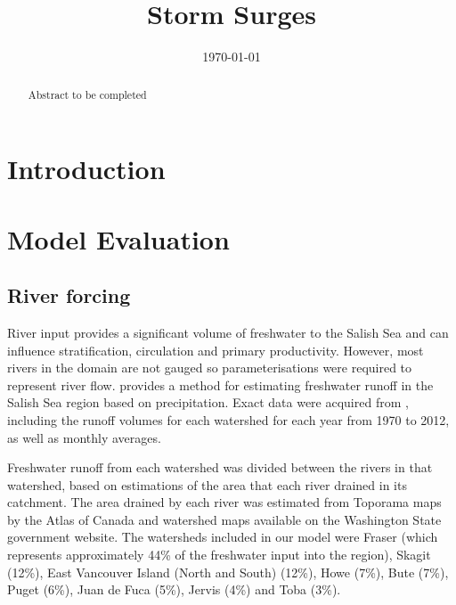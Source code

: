 \documentclass[pdftex,12pt]{article}
\title{Storm Surges}
\date{\today}
\begin{document}
\maketitle

\begin{abstract}
Abstract to be completed
\end{abstract}

\section{Introduction}\label{sec:intro}
\citep{masson2004modelling} %

\section{Model Evaluation}\label{sec:model}

\subsection{River forcing}
River input provides a significant volume of freshwater to the Salish Sea and can influence stratification, circulation and primary productivity. However, most rivers in the domain are not gauged so parameterisations were required to represent river flow. \cite{morrison2011rivers} provides a method for estimating freshwater runoff in the Salish Sea region based on precipitation. Exact data were acquired from \cite{morrison2011rivers}, including the runoff volumes for each watershed for each year from 1970 to 2012, as well as monthly averages. 

Freshwater runoff from each watershed was divided between the rivers in that watershed, based on estimations of the area that each river drained in its catchment. The area drained by each river was estimated from Toporama maps by the Atlas of Canada and watershed maps available on the Washington State government website. The watersheds included in our model were Fraser (which represents approximately 44\% of the freshwater input into the region), Skagit (12\%), East Vancouver Island (North and South) (12\%), Howe (7\%), Bute (7\%), Puget (6\%), Juan de Fuca (5\%), Jervis (4\%) and Toba (3\%). 
\end{document}
